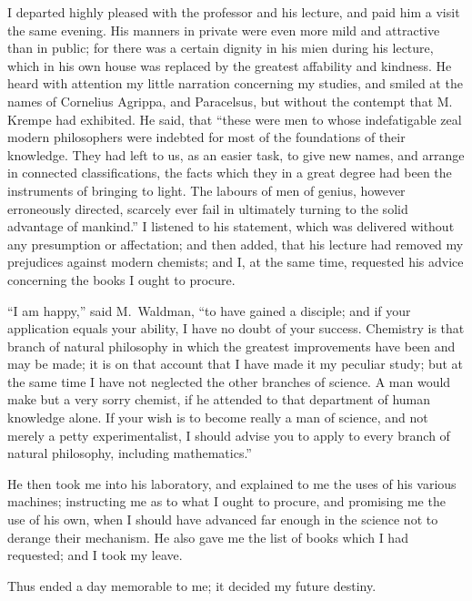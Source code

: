 I departed highly pleased with the
professor and his lecture, and paid him
a visit the same evening. His manners
in private were even more mild
and attractive than in public; for there
was a certain dignity in his mien
during his lecture, which in his own
house was replaced by the greatest
affability and kindness. He heard with
attention my little narration concerning
my studies, and smiled at the names of
Cornelius Agrippa, and Paracelsus,
but without the contempt that M.~%
Krempe had exhibited. He said, that
``these were men to whose indefatigable
zeal modern philosophers were indebted
for most of the foundations of their
knowledge. They had left to us, as
an easier task, to give new names, and
arrange in connected classifications, the
facts which they in a great degree
had been the instruments of bringing
to light. The labours of men of genius,
however erroneously directed, scarcely
ever fail in ultimately turning to the
solid advantage of mankind.'' I listened
to his statement, which was delivered
without any presumption or affectation;
and then added, that his lecture had
removed my prejudices against modern
chemists; and I, at the same time, requested
his advice concerning the books
I ought to procure.

``I am happy,'' said M.~Waldman,
``to have gained a disciple; and if
your application equals your ability, I
have no doubt of your success. Chemistry
is that branch of natural philosophy
in which the greatest improvements
have been and may be made;
it is on that account that I have made
it my peculiar study; but at the same
time I have not neglected the other
branches of science. A man would
make but a very sorry chemist, if he
attended to that department of human
knowledge alone. If your wish is to
become really a man of science, and
not merely a petty experimentalist, I
should advise you to apply to every
branch of natural philosophy, including
mathematics.''

He then took me into his laboratory,
and explained to me the uses of his various
machines; instructing me as to
what I ought to procure, and promising
me the use of his own, when I should
have advanced far enough in the science
not to derange their mechanism. He
also gave me the list of books which I
had requested; and I took my leave.

Thus ended a day memorable to me;
it decided my future destiny.


